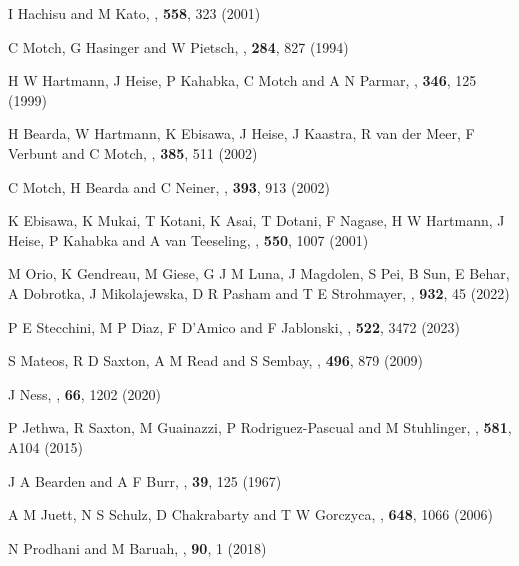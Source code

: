\begin{thebibliography}{100}
	I Hachisu and M Kato, \textit{\ApJ}, \textbf{558}, 323 (2001)
	
	C Motch, G Hasinger and W Pietsch, \textit{\AnA}, \textbf{284}, 827 (1994)

	H W Hartmann, J Heise, P Kahabka, C Motch and A N Parmar, \textit{\AnA}, \textbf{346}, 125 (1999)
	
	H Bearda, W Hartmann, K Ebisawa, J Heise, J Kaastra, R van der Meer, F Verbunt and C Motch, \textit{\AnA}, \textbf{385}, 511 (2002)

	C Motch, H Bearda and C Neiner, \textit{\AnA}, \textbf{393}, 913 (2002)

	K Ebisawa, K Mukai, T Kotani, K Asai, T Dotani, F Nagase, H W Hartmann, J Heise, P Kahabka and A van Teeseling, \textit{\ApJ}, \textbf{550}, 1007 (2001)

	M Orio, K Gendreau, M Giese, G J M Luna, J Magdolen, S Pei, B Sun, E Behar, A Dobrotka, J Mikolajewska, D R Pasham and T E Strohmayer, \textit{\ApJ}, \textbf{932}, 45 (2022)
	
	P E Stecchini, M P Diaz, F D’Amico and F Jablonski, \textit{\MNRAS}, \textbf{522}, 3472 (2023)
	
	S Mateos, R D Saxton, A M Read and S Sembay, \textit{\AnA}, \textbf{496}, 879 (2009)
	
	J Ness, \textit{\ASR}, \textbf{66}, 1202 (2020)
	
	P Jethwa, R Saxton, M Guainazzi, P Rodriguez-Pascual and M Stuhlinger, \textit{\AnA}, \textbf{581}, A104 (2015)
	
	J A Bearden and A F Burr, \textit{\RMP}, \textbf{39}, 125 (1967)
	
	A M Juett, N S Schulz, D Chakrabarty and T W Gorczyca, \textit{\ApJ}, \textbf{648}, 1066 (2006)
	
	N Prodhani and M Baruah, \textit{\Pram}, \textbf{90}, 1 (2018)
	


\end{thebibliography}
